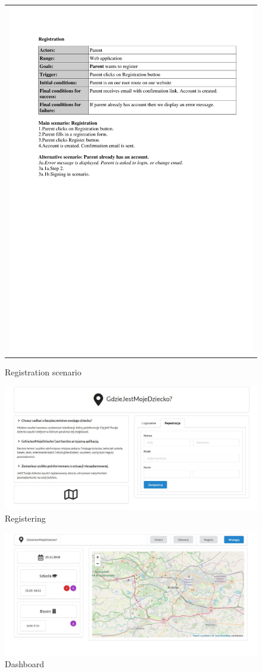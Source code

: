 \documentclass{sprawozdanie-agh}
\begin{document}
		\begin{figure}[H] 
			\centering
			\begin{tabular}{c}
				\includegraphics[width=.80\textwidth]{registration} 
			\end{tabular} 
		\caption{Registration scenario}
		\end{figure}

		\begin{figure}[H]
			\centering
			\includegraphics[width=.80\textwidth]{register}
			\caption{Registering}
		\end{figure}

		\begin{figure}[H]
			\centering
			\includegraphics[width=.80\textwidth]{dashboard}
			\caption{Dashboard}
		\end{figure}
\end{document}
